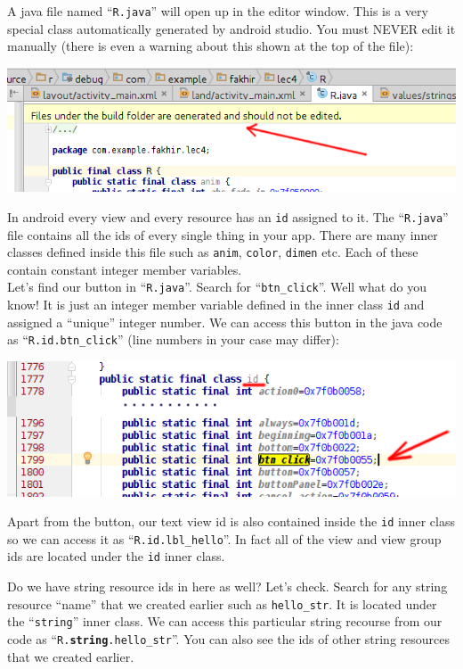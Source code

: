 A java file named ``\texttt{R.java}'' will open up in the editor window. This is a very special class automatically generated by android studio. You must NEVER edit it manually (there is even a warning about this shown at the top of the file):

\begin{center}
	\includegraphics[scale=0.4]{chapters/ch04/images/29}
\end{center}

In android every view and every resource has an \texttt{id} assigned to it. The ``\texttt{R.java}'' file contains all the ids of every single thing in your app. There are many inner classes defined inside this file such as \texttt{anim}, \texttt{color}, \texttt{dimen} etc. Each of these contain constant integer member variables. \\

Let's find our button in ``\texttt{R.java}''. Search for ``\texttt{btn\_click}''. Well what do you know! It is just an integer member variable defined in the inner class \texttt{id} and assigned a ``unique'' integer number. We can access this button in the java code as ``\texttt{R.id.btn\_click}'' (line numbers in your case may differ):

\begin{center}
	\includegraphics[scale=0.4]{chapters/ch04/images/32}
\end{center}

Apart from the button, our text view id is also contained inside the \texttt{id} inner class so we can access it as ``\texttt{R.id.lbl\_hello}''. In fact all of the view and view group ids are located under the \texttt{id} inner class.

Do we have string resource ids in here as well? Let's check. Search for any string resource ``name'' that we created earlier such as \texttt{hello\_str}. It is located under the ``\texttt{string}'' inner class. We can access this particular string recourse from our code as ``\texttt{R.}\textbf{\texttt{string}}\texttt{.hello\_str}''. You can also see the ids of other string resources that we created earlier. 


